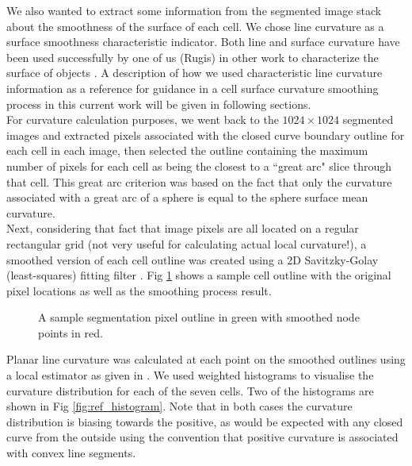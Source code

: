\documentclass[10pt,letterpaper]{article}
\begin{document}
We also wanted to extract some information from the segmented image stack about the smoothness of the surface of each cell. We chose line curvature as a surface smoothness characteristic indicator. Both line and surface curvature have been used successfully  by one of us (Rugis) in other work to characterize the surface of objects \cite{Rugis_2005_SCMMD, Rugis_2006_SRMRSD, Rugis_2006_SISCE}. A description of how we used characteristic line curvature information as a reference for guidance in a cell surface curvature smoothing process in this current work will be given in following sections.\\

For curvature calculation purposes, we went back to the $1024 \times 1024$ segmented images and extracted pixels associated with the closed curve boundary outline for each cell in each  image, then selected the outline containing the maximum number of pixels for each cell as being the closest to a ``great arc" slice through that cell. This great arc criterion was based on the fact that only the curvature associated with a great arc of a sphere is equal to the sphere surface mean curvature.\\

Next, considering that fact that image pixels are all located on a regular rectangular grid (not very useful for calculating actual local curvature!), a smoothed version of each cell outline was created using a 2D Savitzky-Golay (least-squares) fitting filter \cite{doi:10.1021/ac60214a047}. Fig \ref{fig:slice_outline} shows a sample cell outline with the original pixel locations as well as the smoothing process result.\\

\begin{figure}[h!]
\caption{A sample segmentation pixel outline in green with smoothed node points in red.}
\label{fig:slice_outline}
\end{figure}

Planar line curvature was calculated at each point on the smoothed outlines using a local estimator as given in \cite{Rugis_2008_DSC}. We used weighted histograms to visualise the curvature distribution for each of the seven cells. Two of the histograms are shown in Fig \ref{fig:ref_histogram}. Note that in both cases the curvature distribution is biasing towards the positive, as would be expected with any closed curve from the outside using the convention that positive curvature is associated with convex line segments.\\
\end{document}
